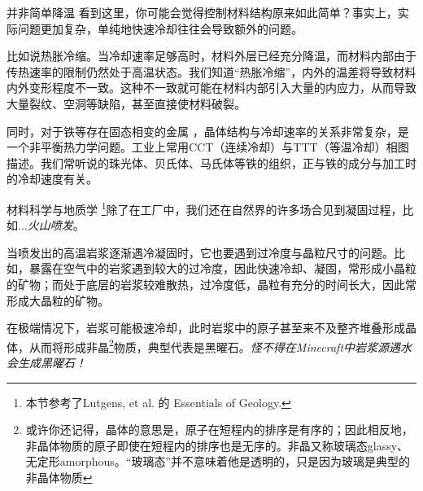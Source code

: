 \begin{example}{并非简单降温}
看到这里，你可能会觉得控制材料结构原来如此简单？事实上，实际问题更加复杂，单纯地快速冷却往往会导致额外的问题。

比如说热胀冷缩。当冷却速率足够高时，材料外层已经充分降温，而材料内部由于传热速率的限制仍然处于高温状态。我们知道“热胀冷缩”，内外的温差将导致材料内外变形程度不一致。这种不一致就可能在材料内部引入大量的内应力，从而导致大量裂纹、空洞等缺陷，甚至直接使材料破裂。

同时，对于铁等存在固态相变的金属  ，晶体结构与冷却速率的关系非常复杂，是一个非平衡热力学问题。工业上常用CCT（连续冷却）与TTT（等温冷却）相图描述。我们常听说的珠光体、贝氏体、马氏体等铁的组织，正与铁的成分与加工时的冷却速度有关。
\end{example}

\begin{example}{材料科学与地质学}
\footnote{本节参考了Lutgens, et al. 的 Essentials of Geology.}除了在工厂中，我们还在自然界的许多场合见到凝固过程，比如...\textsl{火山喷发}。

当喷发出的高温岩浆逐渐遇冷凝固时，它也要遇到过冷度与晶粒尺寸的问题。比如，暴露在空气中的岩浆遇到较大的过冷度，因此快速冷却、凝固，常形成小晶粒的矿物；而处于底层的岩浆较难散热，过冷度低，晶粒有充分的时间长大，因此常形成大晶粒的矿物。

在极端情况下，岩浆可能极速冷却，此时岩浆中的原子甚至来不及整齐堆叠形成晶体，从而将形成非晶\footnote{或许你还记得，晶体的意思是，原子在短程内的排序是有序的；因此相反地，非晶体物质的原子即使在短程内的排序也是无序的。非晶又称玻璃态glassy、无定形amorphous。“玻璃态”并不意味着他是透明的，只是因为玻璃是典型的非晶体物质}物质，典型代表是黑曜石。\textsl{怪不得在Minecraft中岩浆源遇水会生成黑曜石！}
\end{example}
